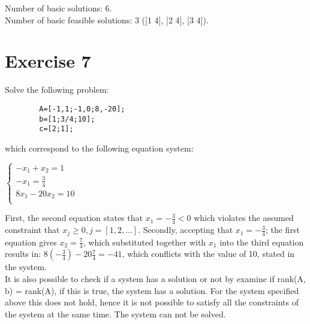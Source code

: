 \documentclass{article}
\begin{document}
    \noindent
    Number of basic solutions: 6. \\
    Number of basic feasible solutions: 3 ([1 4], [2 4], [3 4]).

\section*{Exercise 7}

    Solve the following problem:

    \begin{lstlisting}
        A=[-1,1;-1,0;8,-20];
        b=[1;3/4;10];
        c=[2;1];
    \end{lstlisting}

    which correspond to the following equation system:

    \begin{center}
        \begin{math}
            \begin{cases}
                -x_1 + x_2 = 1 \\
                -x_1 = \frac{3}{4} \\
                8x_1 - 20x_2 = 10 \\
            \end{cases}
        \end{math}
    \end{center}

    First, the second equation states that $x_1 = -\frac{3}{4} < 0$ which violates the assumed
    constraint that $x_j \geq 0 , j=[1,2,\dots]$. Secondly, accepting that $x_1 =
    -\frac{3}{4}$; the first equation gives $x_2 = \frac{7}{4}$, which
    substituted together with $x_1$ into the third equation results in:
    $8(-\frac{3}{4}) - 20\frac{7}{4} = -41$, which conflicts with the value of
    10, stated in the system. \\

    \noindent
    It is also possible to check if a system has a solution or not by examine
    if rank(A, b) = rank(A), if this is true, the system has a solution. For
    the system specified above this does not hold, hence it is not possible to
    satisfy all the constraints of the system at the same time. The system can
    not be solved.
\end{document}
